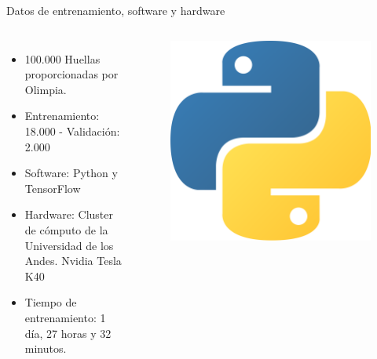 \documentclass[12pt,aspectratio=169]{beamer}
\begin{document}
\begin{frame}{Datos de entrenamiento, software y hardware}

    \begin{columns}[c] 
            \begin{itemize}
                \item 100.000 Huellas proporcionadas por Olimpia.
                \vspace{3mm}
                \item Entrenamiento: 18.000 - Validación: 2.000
                \vspace{3mm}
                \item Software: Python y TensorFlow
                \vspace{3mm}
                \item Hardware: Cluster de cómputo de la Universidad de los Andes. Nvidia Tesla K40
                \vspace{3mm}
                \item Tiempo de entrenamiento: 1 día, 27 horas y 32 minutos.
            \end{itemize}
            \begin{figure}
                \includegraphics[scale=0.04]{figs/python}
            \end{figure}

\end{columns}
\end{frame}
\end{document}

